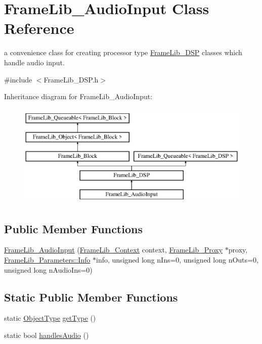 \hypertarget{class_frame_lib___audio_input}{}\section{Frame\+Lib\+\_\+\+Audio\+Input Class Reference}
\label{class_frame_lib___audio_input}


a convenience class for creating processor type \hyperlink{class_frame_lib___d_s_p}{Frame\+Lib\+\_\+\+D\+SP} classes which handle audio input.  




{\ttfamily \#include $<$Frame\+Lib\+\_\+\+D\+S\+P.\+h$>$}

Inheritance diagram for Frame\+Lib\+\_\+\+Audio\+Input\+:\begin{figure}[H]
\begin{center}
\leavevmode
\includegraphics[height=5.000000cm]{class_frame_lib___audio_input}
\end{center}
\end{figure}
\subsection*{Public Member Functions}
\begin{DoxyCompactItemize}
\item 
\hyperlink{class_frame_lib___audio_input_a8ea6d703ceb96e95716c8d28a5a91f90}{Frame\+Lib\+\_\+\+Audio\+Input} (\hyperlink{class_frame_lib___context}{Frame\+Lib\+\_\+\+Context} context, \hyperlink{struct_frame_lib___proxy}{Frame\+Lib\+\_\+\+Proxy} $\ast$proxy, \hyperlink{class_frame_lib___parameters_1_1_info}{Frame\+Lib\+\_\+\+Parameters\+::\+Info} $\ast$info, unsigned long n\+Ins=0, unsigned long n\+Outs=0, unsigned long n\+Audio\+Ins=0)
\end{DoxyCompactItemize}
\subsection*{Static Public Member Functions}
\begin{DoxyCompactItemize}
\item 
static \hyperlink{_frame_lib___types_8h_a842c5e2e69277690b064bf363c017980}{Object\+Type} \hyperlink{class_frame_lib___audio_input_a8a6f94b1530b3fd5b604d3151fad5220}{get\+Type} ()
\item 
static bool \hyperlink{class_frame_lib___audio_input_ad0586445ce01e95a3c832ecdc5dc1200}{handles\+Audio} ()
\end{DoxyCompactItemize}
